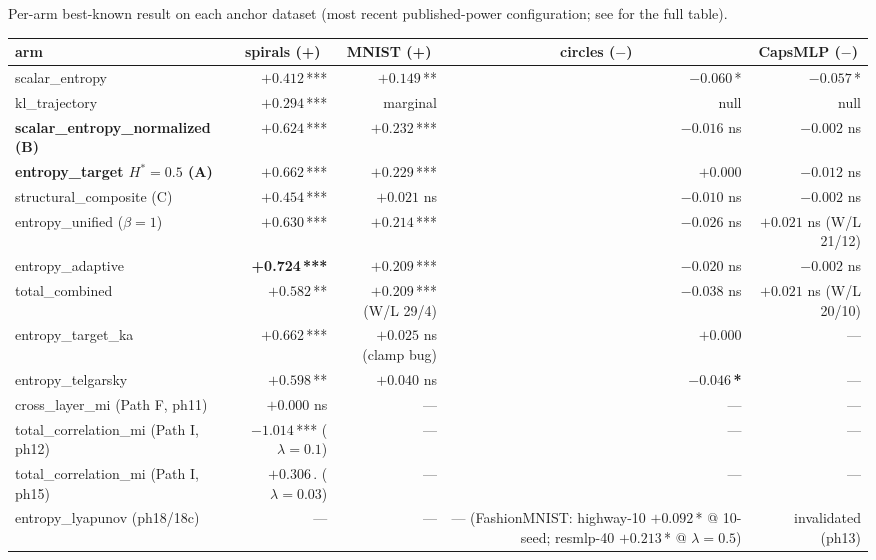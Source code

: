 \documentclass[10pt,a4paper]{article}
\newcommand{\code}[1]{\texttt{\detokenize{#1}}}
\begin{document}
Per-arm best-known result on each anchor dataset (most recent published-power
configuration; see \code{RESULTS_VIEWS_SUITE.md} for the full table).

\begin{center}
\small
\setlength{\tabcolsep}{4pt}
\begin{tabular}{@{}lrrrr@{}}
\toprule
arm & \multicolumn{1}{c}{spirals (+)} & \multicolumn{1}{c}{MNIST (+)}
    & \multicolumn{1}{c}{circles ($-$)} & \multicolumn{1}{c}{CapsMLP ($-$)} \\
\midrule
scalar\_entropy             & $+0.412$\,*** & $+0.149$\,**  & $-0.060$\,*  & $-0.057$\,*  \\
kl\_trajectory              & $+0.294$\,*** & marginal      & null         & null         \\
\midrule
\textbf{scalar\_entropy\_normalized (B)} & $+0.624$\,*** & $+0.232$\,*** & $-0.016$ ns  & $-0.002$ ns  \\
\textbf{entropy\_target $H^*{=}0.5$ (A)} & $+0.662$\,*** & $+0.229$\,*** & $+0.000$     & $-0.012$ ns  \\
structural\_composite (C)   & $+0.454$\,*** & $+0.021$ ns   & $-0.010$ ns  & $-0.002$ ns  \\
entropy\_unified ($\beta{=}1$) & $+0.630$\,*** & $+0.214$\,*** & $-0.026$ ns  & $+0.021$ ns (W/L 21/12) \\
entropy\_adaptive           & \textbf{+0.724\,***} & $+0.209$\,*** & $-0.020$ ns  & $-0.002$ ns  \\
total\_combined             & $+0.582$\,**  & $+0.209$\,*** (W/L 29/4) & $-0.038$ ns  & $+0.021$ ns (W/L 20/10) \\
\midrule
entropy\_target\_ka          & $+0.662$\,*** & $+0.025$ ns (clamp bug) & $+0.000$     & --- \\
entropy\_telgarsky           & $+0.598$\,**  & $+0.040$ ns   & \textbf{$-0.046$\,*} & --- \\
\midrule
cross\_layer\_mi (Path F, ph11)        & $+0.000$ ns & ---       & ---         & --- \\
total\_correlation\_mi (Path I, ph12)  & $-1.014$\,*** ($\lambda=0.1$) & --- & --- & --- \\
total\_correlation\_mi (Path I, ph15)  & $+0.306$\,. ($\lambda=0.03$) & --- & --- & --- \\
entropy\_lyapunov (ph18/18c)           & --- & --- & --- (FashionMNIST: highway-10 $+0.092$\,* @ 10-seed; resmlp-40 $+0.213$\,* @ $\lambda{=}0.5$) & invalidated (ph13) \\
\bottomrule
\end{tabular}
\end{center}
\end{document}
